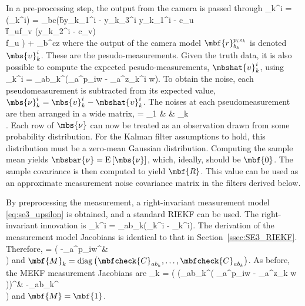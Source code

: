 In a pre-processing step, the output from the camera is passed through
\bdis
	\mbs{\upsilon}_k^i = (_k^i) = _{bc}\left(\f{b}{y_{k_1}^i - y_{k_3}^i}
		y_{k_1}^i - c_u \\
		\f{f_u}{f_v} (y_{k_2}^i - c_v) \\
		f_u
	\ema\right) + _{b}^{cz}
\edis
where the output of the camera model $\mbf{r}_{b_k}^{p_iz_k}$ is denoted $\mbs{\upsilon}_k^i$. These are the pesudo-measurements. Given the truth data, it is also possible to compute the expected pesudo-measurements, $\mbshat{\upsilon}_k^i$, using 
\beq
	\mbshat{\upsilon}_k^i = _{ab_k}^\trans(_a^{p_iw} - _a^{z_k^i w}). \label{eq:se3_upsilon}
\eeq 
To obtain the noise, each pseudomeasurement is subtracted from its expected value, $\mbs{\nu}_k^i = \mbs{\upsilon}_k^i - \mbshat{\upsilon}_k^i$. The noises at each pseudomeasurement are then arranged in a wide matrix,
\bdis
	\mbs{\nu} = 
		\mbs{\nu}_1  & \cdots & \mbs{\nu}_k \\
	\ema.
\edis
Each row of $\mbs{\nu}$ can now be treated as an observation drawn from some probability distribution. For the Kalman filter assumptions to hold, this distribution must be a zero-mean Gaussian distribution. Computing the sample mean yields $\mbsbar{\nu} = \textrm{E}\left[\mbs{\nu}\right]$, which, ideally, should be $\mbf{0}$. The sample covariance is then computed to yield $\mbf{R}$. This value can be used as an approximate measurement noise covariance matrix in the filters derived below.  


By preprocessing the measurement, a right-invariant measurement model \eqref{eq:se3_upsilon} is obtained, and a standard RIEKF can be used. The right-invariant innovation is 
\bdis
	_k^i = _{ab_k}(\mbs{\upsilon}_k^i - \mbscheck{\upsilon}_k^i).  
\edis
The derivation of the measurement model Jacobians is identical to that in Section~\ref{ssec:SE3_RIEKF}. Therefore,
\bdis
	 = \left(
		-{_a^{p_iw}}^\times &  \\
	\ema
	\right)
\edis
and $\mbf{M}_k = \textrm{diag}\left(\mbfcheck{C}_{ab_k},\ldots,\mbfcheck{C}_{ab_k}\right)$.
As before, the MEKF measurement Jacobians are
\bdis
	_k = \left(
		  \left(_{ab_k}^\trans\left( _a^{p_iw} - _a^{z_k w} \right)\right)^\times & -_{ab_k}^\trans \\
	\ema
	\right)
\edis
and $\mbf{M} = \mbf{1}$.

